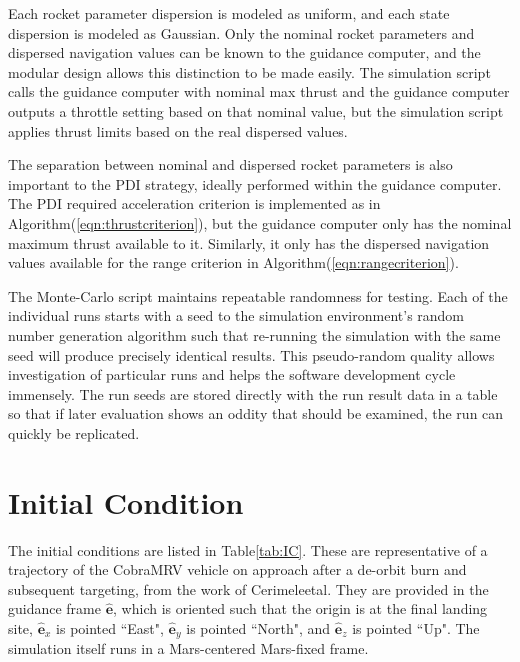 Each rocket parameter dispersion is modeled as uniform, and each state dispersion is modeled as Gaussian. Only the nominal rocket parameters and dispersed navigation values can be known to the guidance computer, and the modular design allows this distinction to be made easily. The simulation script calls the guidance computer with nominal max thrust and the guidance computer outputs a throttle setting based on that nominal value, but the simulation script applies thrust limits based on the real dispersed values. 

The separation between nominal and dispersed rocket parameters is also important to the PDI strategy, ideally performed within the guidance computer. The PDI required acceleration criterion is implemented as in Algorithm\:(\ref{eqn:thrustcriterion}), but the guidance computer only has the nominal maximum thrust available to it. Similarly, it only has the dispersed navigation values available for the range criterion in Algorithm\:(\ref{eqn:rangecriterion}).

The Monte-Carlo script maintains repeatable randomness for testing. Each of the individual runs starts with a seed to the simulation environment's random number generation algorithm such that re-running the simulation with the same seed will produce precisely identical results. This pseudo-random quality allows investigation of particular runs and helps the software development cycle immensely. The run seeds are stored directly with the run result data in a table so that if later evaluation shows an oddity that should be examined, the run can quickly be replicated.



\section{Initial Condition} \label{sec:IC}
The initial conditions are listed in Table\:\ref{tab:IC}. These are representative of a trajectory of the CobraMRV vehicle on approach after a de-orbit burn and subsequent targeting, from the work of Cerimele\:et\:al\:\cite{CERIMELE}. They are provided in the guidance frame $\hat{\bm{e}}$, which is oriented such that the origin is at the final landing site, $\hat{\bm{e}}_x$ is pointed ``East", $\hat{\bm{e}}_y$ is pointed ``North", and $\hat{\bm{e}}_z$ is pointed ``Up". The simulation itself runs in a Mars-centered Mars-fixed frame. 

